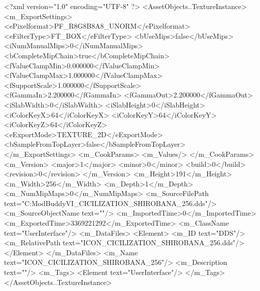 <?xml version="1.0" encoding="UTF-8" ?>
<AssetObjects..TextureInstance>
	<m_ExportSettings>
		<ePixelformat>PF_R8G8B8A8_UNORM</ePixelformat>
		<eFilterType>FT_BOX</eFilterType>
		<bUseMips>false</bUseMips>
		<iNumManualMips>0</iNumManualMips>
		<bCompleteMipChain>true</bCompleteMipChain>
		<fValueClampMin>0.000000</fValueClampMin>
		<fValueClampMax>1.000000</fValueClampMax>
		<fSupportScale>1.000000</fSupportScale>
		<fGammaIn>2.200000</fGammaIn>
		<fGammaOut>2.200000</fGammaOut>
		<iSlabWidth>0</iSlabWidth>
		<iSlabHeight>0</iSlabHeight>
		<iColorKeyX>64</iColorKeyX>
		<iColorKeyY>64</iColorKeyY>
		<iColorKeyZ>64</iColorKeyZ>
		<eExportMode>TEXTURE_2D</eExportMode>
		<bSampleFromTopLayer>false</bSampleFromTopLayer>
	</m_ExportSettings>
	<m_CookParams>
		<m_Values/>
	</m_CookParams>
	<m_Version>
		<major>1</major>
		<minor>0</minor>
		<build>0</build>
		<revision>0</revision>
	</m_Version>
	<m_Height>191</m_Height>
	<m_Width>256</m_Width>
	<m_Depth>1</m_Depth>
	<m_NumMipMaps>0</m_NumMipMaps>
	<m_SourceFilePath text="C:\Users\asus\Documents\Firaxis ModBuddy\Civilization VI\temppic\ICON_CICILIZATION_SHIROBANA_256.dds"/>
	<m_SourceObjectName text=""/>
	<m_ImportedTime>0</m_ImportedTime>
	<m_ExportedTime>3369221292</m_ExportedTime>
	<m_ClassName text="UserInterface"/>
	<m_DataFiles>
		<Element>
			<m_ID text="DDS"/>
			<m_RelativePath text="ICON_CICILIZATION_SHIROBANA_256.dds"/>
		</Element>
	</m_DataFiles>
	<m_Name text="ICON_CICILIZATION_SHIROBANA_256"/>
	<m_Description text=""/>
	<m_Tags>
		<Element text="UserInterface"/>
	</m_Tags>
</AssetObjects..TextureInstance>

